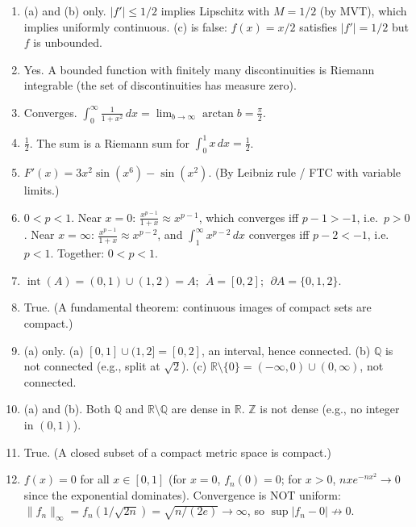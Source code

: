 \documentclass[11pt]{article}
\begin{document}
\begin{enumerate}
\item (a) and (b) only. \quad $|f'|\le 1/2$ implies Lipschitz with $M=1/2$ (by MVT), which implies uniformly continuous. (c) is false: $f(x)=x/2$ satisfies $|f'|=1/2$ but $f$ is unbounded.

\item Yes. A bounded function with finitely many discontinuities is Riemann integrable (the set of discontinuities has measure zero).

\item Converges. $\displaystyle\int_0^{\infty}\frac{1}{1+x^2}\,dx = \lim_{b\to\infty}\arctan b = \frac{\pi}{2}$.

\item $\displaystyle\frac{1}{2}$. The sum is a Riemann sum for $\displaystyle\int_0^1 x\,dx = \frac{1}{2}$.

\item $F'(x) = 3x^2\sin(x^6) - \sin(x^2)$. (By Leibniz rule / FTC with variable limits.)

\item $0<p<1$. Near $x=0$: $\frac{x^{p-1}}{1+x}\approx x^{p-1}$, which converges iff $p-1>-1$, i.e.\ $p>0$. Near $x=\infty$: $\frac{x^{p-1}}{1+x}\approx x^{p-2}$, and $\int_1^\infty x^{p-2}\,dx$ converges iff $p-2<-1$, i.e.\ $p<1$. Together: $0<p<1$.

\item $\operatorname{int}(A)=(0,1)\cup(1,2)=A$; $\;\overline{A}=[0,2]$; $\;\partial A = \{0,1,2\}$.

\item True. (A fundamental theorem: continuous images of compact sets are compact.)

\item (a) only. \quad (a) $[0,1]\cup(1,2] = [0,2]$, an interval, hence connected. (b) $\mathbb{Q}$ is not connected (e.g., split at $\sqrt{2}$). (c) $\mathbb{R}\setminus\{0\}=(-\infty,0)\cup(0,\infty)$, not connected.

\item (a) and (b). \quad Both $\mathbb{Q}$ and $\mathbb{R}\setminus\mathbb{Q}$ are dense in $\mathbb{R}$. $\mathbb{Z}$ is not dense (e.g., no integer in $(0,1)$).

\item True. (A closed subset of a compact metric space is compact.)

\item $f(x)=0$ for all $x\in[0,1]$ (for $x=0$, $f_n(0)=0$; for $x>0$, $nxe^{-nx^2}\to 0$ since the exponential dominates). Convergence is NOT uniform: $\|f_n\|_\infty = f_n(1/\sqrt{2n})=\sqrt{n/(2e)}\to\infty$, so $\sup|f_n-0|\not\to 0$.


\end{enumerate}
\end{document}
